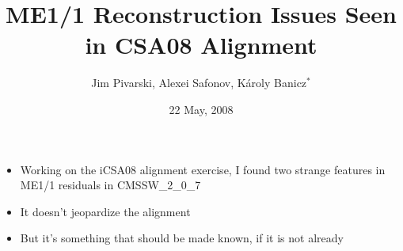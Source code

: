\documentclass[compress]{beamer}
\title{ME1/1 Reconstruction Issues Seen in CSA08 Alignment}
\author{Jim Pivarski, Alexei Safonov, K\'aroly Banicz$^*$}
\institute{Texas A\&M University, $^*$FermiLab}
\date{22 May, 2008}
\begin{document}
\frame{\titlepage}


\begin{frame}
\begin{itemize}\setlength{\itemsep}{0.75 cm}
\item Working on the iCSA08 alignment exercise, I found two strange features in ME1/1 residuals in CMSSW\_2\_0\_7
\item It doesn't jeopardize the alignment
\item But it's something that should be made known, if it is not already
\end{itemize}
\end{frame}
\end{document}
